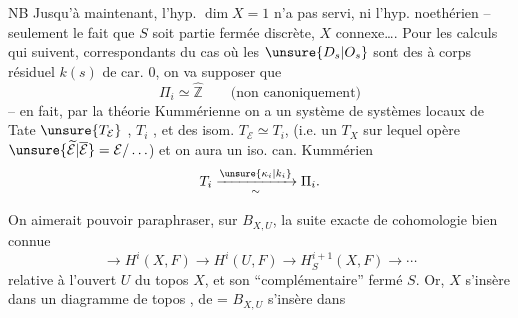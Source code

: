 NB Jusqu'à maintenant, l'hyp.
$\dim X=1$ n'a pas servi, ni l'hyp. noethérien
-- seulement le fait que $S$ soit partie fermée
discrète, $X$ connexe\ldots. Pour les calculs qui
suivent, correspondants du  cas où les
$\unsure{D_s|O_s}$ sont des  à corps résiduel $k(s)$
de car. $0$, on va supposer que
\[
\Pi_i\simeq\widehat{\mathbb Z}\qquad\text{(non canoniquement)}
\]
-- en fait, par la théorie Kummérienne on
a un système de systèmes locaux de Tate
$\unsure{T_{\mathcal E}}$ , $T_i$ , et des isom. $T_{\mathcal E}\simeq T_i$, 
(i.e. un $T_X$ sur lequel opère $\unsure{\widetilde{\mathcal E}|\overline{\mathcal E}}=\mathcal E/\ldots$)
et on aura un iso. can. Kummérien
\[
T_i\xrightarrow[\sim]{\unsure{\kappa_i|k_i}}\Pi_i.
\]

On aimerait pouvoir paraphraser,
sur $B_{X,U}$, la suite exacte de cohomologie
bien connue
\[
\longrightarrow H^i(X,F)\longrightarrow H^i(U,F)
\longrightarrow H^{i+1}_S(X,F)\longrightarrow\cdots
\]
relative à l'ouvert $U$ du topos $X$, et son
``complémentaire'' fermé $S$. Or,  
$X$ s'insère dans un diagramme de topos
,
de = $B_{X,U}$ s'insère dans

